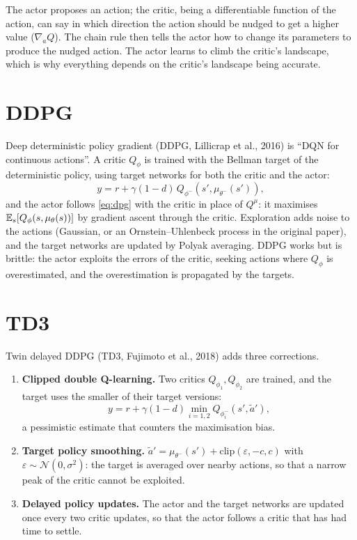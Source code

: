 \begin{intuition}
  The actor proposes an action; the critic, being a differentiable
  function of the action, can say in which direction the action should be
  nudged to get a higher value ($\nabla_a Q$). The chain rule then tells
  the actor how to change its parameters to produce the nudged action. The
  actor learns to climb the critic's landscape, which is why everything
  depends on the critic's landscape being accurate.
\end{intuition}

\section{DDPG}

Deep deterministic policy gradient (DDPG, Lillicrap et al., 2016) is
``DQN for continuous actions''. A critic $Q_\phi$ is trained with the
Bellman target of the deterministic policy, using target networks for both
the critic and the actor:
\begin{equation}
  y = r + \gamma (1 - d)\, Q_{\phi^-}\!\left(s', \mu_{\theta^-}(s')\right),
\end{equation}
and the actor follows \eqref{eq:dpg} with the critic in place of $Q^\mu$:
it maximises $\mathbb{E}_s[Q_\phi(s, \mu_\theta(s))]$ by gradient ascent through the
critic. Exploration adds noise to the actions (Gaussian, or an
Ornstein--Uhlenbeck process in the original paper), and the target networks
are updated by Polyak averaging. DDPG works but is brittle: the actor
exploits the errors of the critic, seeking actions where $Q_\phi$ is
overestimated, and the overestimation is propagated by the targets.

\section{TD3}

Twin delayed DDPG (TD3, Fujimoto et al., 2018) adds three corrections.
\begin{enumerate}
  \item \textbf{Clipped double Q-learning.} Two critics $Q_{\phi_1},
    Q_{\phi_2}$ are trained, and the target uses the smaller of their
    target versions:
    \begin{equation}
      y = r + \gamma (1 - d) \min_{i = 1, 2} Q_{\phi_i^-}(s', \tilde a'),
    \end{equation}
    a pessimistic estimate that counters the maximisation bias.
  \item \textbf{Target policy smoothing.} $\tilde a' = \mu_{\theta^-}(s') +
    \mathrm{clip}(\varepsilon, -c, c)$ with $\varepsilon \sim \mathcal{N}(0,
    \sigma^2)$: the target is averaged over nearby actions, so that a narrow
    peak of the critic cannot be exploited.
  \item \textbf{Delayed policy updates.} The actor and the target networks
    are updated once every two critic updates, so that the actor follows a
    critic that has had time to settle.
\end{enumerate}

